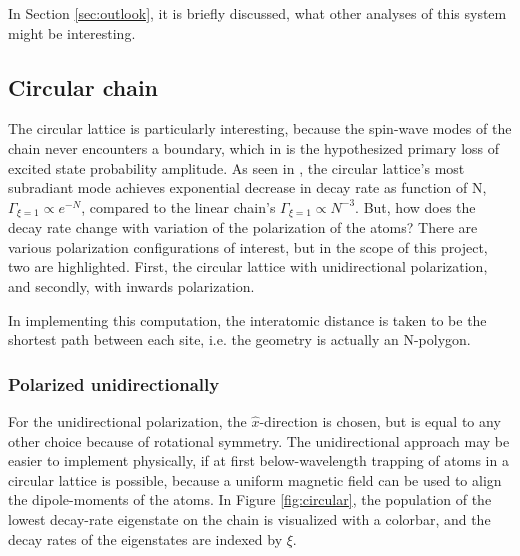 \documentclass{article}
\begin{document}
In Section \ref{sec:outlook}, it is briefly discussed, what other analyses of this system might be interesting. 

\subsection{Circular chain}\label{disc:circular}

\noindent
The circular lattice is particularly interesting, because the spin-wave modes of the chain never encounters a boundary, which in \cite{Asenjo} is the hypothesized primary loss of excited state probability amplitude. As seen in \cite[Section III.B.4]{Asenjo}, the circular lattice's most subradiant mode achieves exponential decrease in decay rate as function of N, $\Gamma_{\xi = 1} \propto e^{-N}$, compared to the linear chain's $\Gamma_{\xi=1} \propto N^{-3}$. But, how does the decay rate change with variation of the polarization of the atoms? There are various polarization configurations of interest, but in the scope of this project, two are highlighted. First, the circular lattice with unidirectional polarization, and secondly, with inwards polarization. 

In implementing this computation, the interatomic distance is taken to be the shortest path between each site, i.e. the geometry is actually an N-polygon. 

\subsubsection{Polarized unidirectionally}

\noindent
For the unidirectional polarization, the $\hat{x}$-direction is chosen, but is equal to any other choice because of rotational symmetry. The unidirectional approach may be easier to implement physically, if at first below-wavelength trapping of atoms in a circular lattice is possible, because a uniform magnetic field can be used to align the dipole-moments of the atoms. In Figure \ref{fig:circular}, the population of the lowest decay-rate eigenstate on the chain is visualized with a colorbar, and the decay rates of the eigenstates are indexed by $\xi$. 
\end{document}
